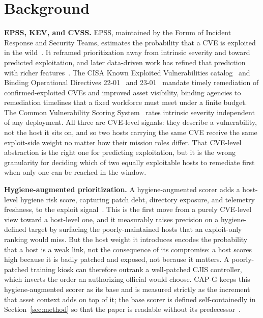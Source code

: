 \section{Background}
\label{sec:background}

\textbf{EPSS, KEV, and CVSS.} EPSS, maintained by the Forum of Incident Response and Security
Teams, estimates the probability that a CVE is exploited in the wild~\cite{jacobs2021epss,%
firstepss}. It reframed prioritization away from intrinsic severity and toward predicted
exploitation, and later data-driven work has refined that prediction with richer
features~\cite{jacobs2023enhancing}. The CISA Known Exploited Vulnerabilities
catalog~\cite{cisakev} and Binding Operational Directives 22-01~\cite{cisabod2201} and
23-01~\cite{cisabod2301} mandate timely remediation of confirmed-exploited CVEs and improved
asset visibility, binding agencies to remediation timelines that a fixed workforce must meet
under a finite budget. The Common Vulnerability Scoring System~\cite{cvss31} rates intrinsic
severity independent of any deployment. All three are CVE-level signals: they describe a
vulnerability, not the host it sits on, and so two hosts carrying the same CVE receive the same
exploit-side weight no matter how their mission roles differ. That CVE-level abstraction is the
right one for predicting exploitation, but it is the wrong granularity for deciding which of two
equally exploitable hosts to remediate first when only one can be reached in the window.

\textbf{Hygiene-augmented prioritization.} A hygiene-augmented scorer adds a host-level
hygiene risk score, capturing patch debt, directory exposure, and telemetry freshness, to the
exploit signal~\cite{paper4hygieneprio}. This is the first move from a purely CVE-level view
toward a host-level one, and it measurably raises precision on a hygiene-defined target by
surfacing the poorly-maintained hosts that an exploit-only ranking would miss. But the host
weight it introduces encodes the probability that a host is a weak link, not the consequence of
its compromise: a host scores high because it is badly patched and exposed, not because it
matters. A poorly-patched training kiosk can therefore outrank a well-patched CJIS controller,
which inverts the order an authorizing official would choose. CAP-G keeps this hygiene-augmented
scorer as its base and is measured strictly as the increment that asset context adds on top of
it; the base scorer is defined self-containedly in Section~\ref{sec:method} so that the paper is
readable without its predecessor~\cite{paper4hygieneprio,paper1vulnprio}.

